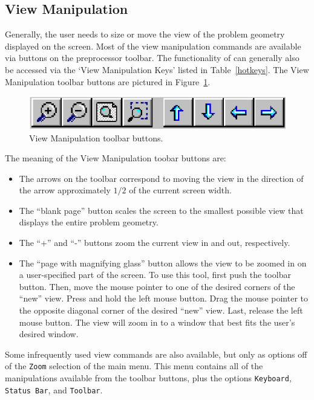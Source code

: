 \documentclass[12pt]{report}
\begin{document}
\subsection{View Manipulation} \label{view_manipulation}

Generally, the user needs to size or move the view of the problem
geometry displayed on the screen.  Most of the view manipulation
commands are available via buttons on the preprocessor toolbar. The
functionality of can generally also be accessed via the `View
Manipulation Keys' listed in Table~\ref{hotkeys}.  The View
Manipulation toolbar buttons are pictured in
Figure~\ref{viewbuttons}.
\begin{figure}[ht]
\centerline{\includegraphics{belaman3.ps}}
\caption{View Manipulation toolbar buttons.}
\label{viewbuttons}
\end{figure}
The meaning of the View Manipulation toobar buttons are:
\begin{itemize}
\item The arrows on the toolbar correspond to moving the view in the direction of
the arrow approximately $1/2$ of the current screen width.
\item The ``blank page'' button scales the screen to the smallest
possible view that displays the entire problem geometry.
\item The ``+'' and ``-'' buttons zoom the current view in and
out, respectively.
\item The ``page with magnifying glass'' button allows the view to
be zoomed in on a user-specified part of the screen.  To use this
tool, first push the toolbar button.  Then, move the mouse pointer
to one of the desired corners of the ``new'' view.  Press and hold
the left mouse button.  Drag the mouse pointer to the opposite
diagonal corner of the desired ``new'' view.  Last, release the
left mouse button.  The view will zoom in to a window that best
fits the user's desired window.
\end{itemize}

Some infrequently used view commands are also available, but only
as options off of the {\tt Zoom} selection of the main menu.  This
menu contains all of the manipulations available from the toolbar
buttons, plus the options {\tt Keyboard}, {\tt Status Bar}, and
{\tt Toolbar}.
\end{document}
